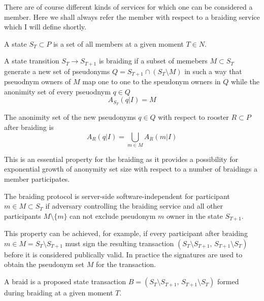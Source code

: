 \documentclass[12pt]{article}
\newenvironment{corollary}[2][Corollary]{\begin{trivlist}
\item[\hskip \labelsep {\bfseries #1}\hskip \labelsep {\bfseries #2.}]}{\end{trivlist}}
\newenvironment{definition}[2][Definition]{\begin{trivlist}
\item[\hskip \labelsep {\bfseries #1}\hskip \labelsep {\bfseries #2.}]}{\end{trivlist}}
\begin{document}
There are of course different kinds of services for which one can be considered a member. Here we shall always refer the member with respect to a braiding service which I will define shortly.

\begin{definition}{(state)}
  A state $S_T \subset P$ is a set of all members at a given moment $T \in N$.
\end{definition}


\begin{definition}{(braiding)}
  A state transition $S_T \to S_{T+1}$ is braiding if a subset of memebers $M \subset S_T$ generate a new set of pseudonyms $Q = S_{T+1} \cap (S_T \setminus M) $ in such a way that pseuodnym owners of $M$ map one to one to the speudonym owners in $Q$ while the anonimity set of every pseuodnym $q \in Q$
  \begin{equation}
    A_{S_T}(q|I) = M
  \end{equation}
\end{definition}

\begin{corollary}{II}
  The anonimity set of the new pseudonyms $q \in Q$ with respect to rooster $R \subset P$ after braiding is
  \begin{equation}
    A_R(q | I) = \bigcup_{m \in M} A_R(m|I) \label{eq:1}
  \end{equation}
\end{corollary}
This is an essential property for the braiding as it provides a possibility for exponential growth of anonymity set size with respect to a number of braidings a member participates.

\begin{definition}{(software-indpendance)}
  The braiding protocol is server-side software-independent for participant $m \in M \subset S_T$ if adversary controlling the braiding service and all other participants $M \setminus \{m\}$ can not exclude pseudonym $m$ owner in the state $S_{T+1}$.
\end{definition}

This property can be achieved, for example, if every participant after braiding $m \in M = S_T \setminus S_{T+1}$ must sign the resulting transaction $(S_T \setminus S_{T+1}, \, S_{T+1} \setminus S_T)$ before it is considered publically valid. In practice the signatures are used to obtain the pseudonym set $M$ for the transaction.

\begin{definition}{(braid)}
  A braid is a proposed state transaction $B = (S_T \setminus S_{T+1}, \, S_{T+1} \setminus S_T)$ formed during braiding at a given moment $T$.
\end{definition}
\end{document}
